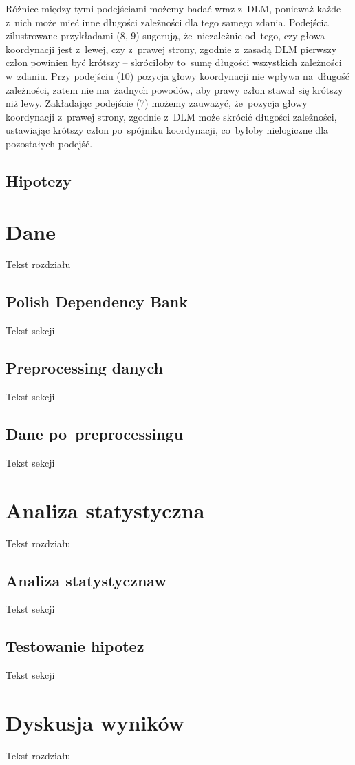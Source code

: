 \documentclass[licencjacka]{pracamgr_Kogni}
\begin{document}
Różnice między tymi podejściami możemy badać wraz z~DLM, ponieważ każde z~nich może mieć inne długości zależności dla tego samego zdania. Podejścia zilustrowane przykładami (8, 9) sugerują, że~niezależnie od~tego, czy głowa koordynacji jest z~lewej, czy z~prawej strony, zgodnie z~zasadą DLM pierwszy człon powinien być krótszy -- skróciłoby to~sumę długości wszystkich zależności w~zdaniu. Przy podejściu (10) pozycja głowy koordynacji nie wpływa na~długość zależności, zatem nie ma~żadnych powodów, aby prawy człon stawał się krótszy niż lewy. Zakładając podejście (7) możemy zauważyć, że~pozycja głowy koordynacji z~prawej strony, zgodnie z~DLM może skrócić długości zależności, ustawiając krótszy człon po~spójniku koordynacji, co~byłoby nielogiczne dla pozostałych podejść.
\section{Hipotezy}
\chapter{Dane}
Tekst rozdziału
\section{Polish Dependency Bank}
Tekst sekcji
\section{Preprocessing danych} %
Tekst sekcji
\section{Dane po~preprocessingu}
Tekst sekcji

\chapter{Analiza statystyczna} %
Tekst rozdziału
\section{Analiza statystycznaw}
Tekst sekcji
\section{Testowanie hipotez}
Tekst sekcji

\chapter{Dyskusja wyników}
Tekst rozdziału
\end{document}
